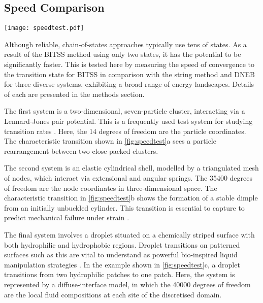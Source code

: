\documentclass[twocolumn,10pt]{revtex4}
\begin{document}
\subsection{Speed Comparison}
\begin{figure*}[tb]
  \texttt{[image: speedtest.pdf]}
  \caption{\label{fig:speedtest}
    \textbf{Comparisons between BITSS, DNEB, and the string method in the convergence to the transition state as a function of the number of calculations of the energy gradient.}
    Three test systems are used: (a) a Lennard-Jones seven-particle cluster, (b) cylindrical shell buckling, and (c) wetting of a chemically-striped surface.
    The configurations shown correspond to the two minimum energy states and the transition state, marked by an asterisk.
    The string method and DNEB are repeated with a differing number of images, as listed in the legend in (c).
  }
\end{figure*}

Although reliable, chain-of-states approaches typically use tens of states.
As a result of the BITSS method using only two states, it has the potential to be significantly faster.
This is tested here by measuring the speed of convergence to the transition state for BITSS in comparison with the string method and DNEB for three diverse systems, exhibiting a broad range of energy landscapes.
Details of each are presented in the methods section.

The first system is a two-dimensional, seven-particle cluster, interacting via a Lennard-Jones pair potential.
This is a frequently used test system for studying transition rates \cite{Wales2002,Passerone2001}.
Here, the 14 degrees of freedom are the particle coordinates.
The characteristic transition shown in \cref{fig:speedtest}a sees a particle rearrangement between two close-packed clusters.

The second system is an elastic cylindrical shell, modelled by a triangulated mesh of nodes, which interact via extensional and angular springs.
The \num{35400} degrees of freedom are the node coordinates in three-dimensional space.
The characteristic transition in \cref{fig:speedtest}b shows the formation of a stable dimple from an initially unbuckled cylinder.
This transition is essential to capture to predict mechanical failure under strain \cite{Panter2019,Virot2017}.

The final system involves a droplet situated on a chemically striped surface with both hydrophilic and hydrophobic regions.
Droplet transitions on patterned surfaces such as this are vital to understand as powerful bio-inspired liquid manipulation strategies  \cite{Kusumaatmaja2006,Brown2016}.
In the example shown in \cref{fig:speedtest}c, a droplet transitions from two hydrophilic patches to one patch.
Here, the system is represented by a diffuse-interface model, in which the \num{40000} degrees of freedom are the local fluid compositions at each site of the discretised domain.
\end{document}
